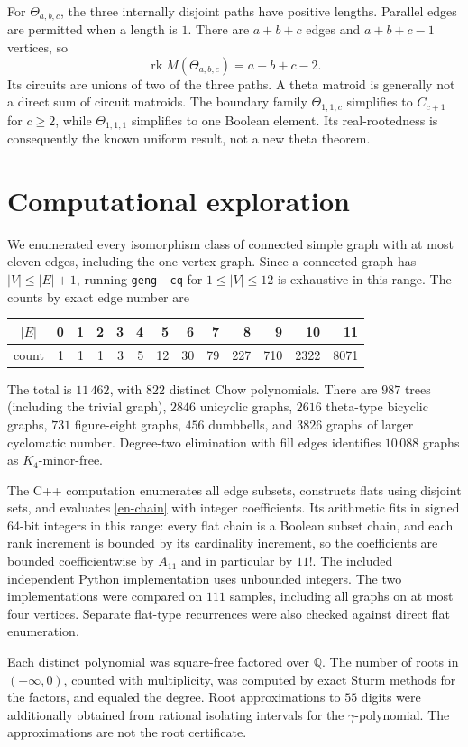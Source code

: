 \documentclass[12pt]{amsart}
\theoremstyle{definition}
\theoremstyle{remark}
\numberwithin{equation}{section}
\newcommand{\rk}{\operatorname{rk}}
\newcommand{\Q}{\mathbb{Q}}
\begin{document}
For $\Theta_{a,b,c}$, the three internally disjoint paths have positive lengths. Parallel edges are permitted when a length is $1$. There are $a+b+c$ edges and $a+b+c-1$ vertices, so
\[
 \rk M(\Theta_{a,b,c})=a+b+c-2.
\]
Its circuits are unions of two of the three paths. A theta matroid is generally not a direct sum of circuit matroids. The boundary family $\Theta_{1,1,c}$ simplifies to $C_{c+1}$ for $c\geq2$, while $\Theta_{1,1,1}$ simplifies to one Boolean element. Its real-rootedness is consequently the known uniform result, not a new theta theorem.

\section{Computational exploration}
We enumerated every isomorphism class of connected simple graph with at most eleven edges, including the one-vertex graph. Since a connected graph has $|V|\leq |E|+1$, running \texttt{geng -cq} for $1\leq |V|\leq12$ is exhaustive in this range. The counts by exact edge number are
\begin{center}\small
\begin{tabular}{c|rrrrrrrrrrrr}
$|E|$&0&1&2&3&4&5&6&7&8&9&10&11\\\hline
count&1&1&1&3&5&12&30&79&227&710&2322&8071
\end{tabular}
\end{center}
The total is $11\,462$, with $822$ distinct Chow polynomials. There are $987$ trees (including the trivial graph), $2846$ unicyclic graphs, $2616$ theta-type bicyclic graphs, $731$ figure-eight graphs, $456$ dumbbells, and $3826$ graphs of larger cyclomatic number. Degree-two elimination with fill edges identifies $10\,088$ graphs as $K_4$-minor-free.

The C++ computation enumerates all edge subsets, constructs flats using disjoint sets, and evaluates \eqref{en-chain} with integer coefficients. Its arithmetic fits in signed 64-bit integers in this range: every flat chain is a Boolean subset chain, and each rank increment is bounded by its cardinality increment, so the coefficients are bounded coefficientwise by $A_{11}$ and in particular by $11!$. The included independent Python implementation uses unbounded integers. The two implementations were compared on $111$ samples, including all graphs on at most four vertices. Separate flat-type recurrences were also checked against direct flat enumeration.

Each distinct polynomial was square-free factored over $\Q$. The number of roots in $(-\infty,0)$, counted with multiplicity, was computed by exact Sturm methods for the factors, and equaled the degree. Root approximations to $55$ digits were additionally obtained from rational isolating intervals for the $\gamma$-polynomial. The approximations are not the root certificate.
\end{document}

